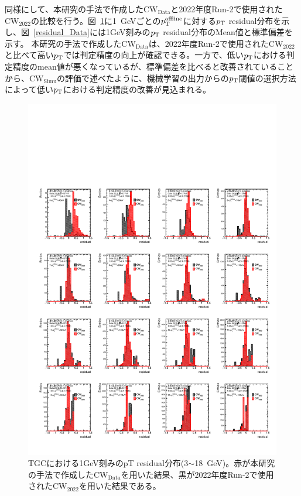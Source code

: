 同様にして、本研究の手法で作成した$\mathrm{CW_{Data}}$と2022年度Run-2で使用された$\mathrm{CW_{2022}}$の比較を行う。図~\ref{residual_Data_3_18}に1~GeVごとの$p_{\rm{T}}^{\rm{offline}}$に対する$p_{\rm{T}}$ residual分布を示し、図~\ref{residual_Data}には1GeV刻みの$p_{\rm{T}}$ residual分布のMean値と標準偏差を示す。
本研究の手法で作成した$\mathrm{CW_{Data}}$は、2022年度Run-2で使用された$\mathrm{CW_{2022}}$と比べて高い$p_{\rm{T}}$では判定精度の向上が確認できる。一方で、低い$p_{\rm{T}}$における判定精度のmean値が悪くなっているが、標準偏差を比べると改善されていることから、$\mathrm{CW_{Simu}}$の評価で述べたように、機械学習の出力からの$p_{\rm{T}}$閾値の選択方法によって低い$p_{\rm{T}}$における判定精度の改善が見込まれる。
\begin{figure}[htbp]
  \centering
  \hspace*{-1cm}
  \includegraphics[clip,width=16cm]{fig/5/residual_Data_3_18_re.pdf}
  \caption{TGCにおける1GeV刻みのpT residual分布(3$\sim$18~GeV)。赤が本研究の手法で作成した$\mathrm{CW_{Data}}$を用いた結果、黒が2022年度Run-2で使用された$\mathrm{CW_{2022}}$を用いた結果である。}
  \label{residual_Data_3_18}
\end{figure}

